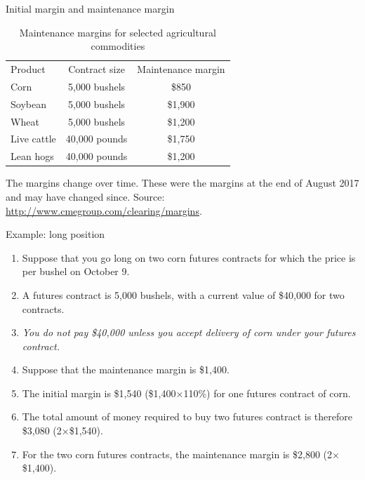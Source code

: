 \documentclass[table,xcolor=pdftex,dvipsnames]{beamer}\usepackage[]{graphicx}\usepackage[]{color}
\begin{document}
\begin{frame}{Initial margin and maintenance margin}
\begin{table}
\caption{Maintenance margins for selected agricultural commodities}
\scriptsize
\begin{tabular}{l c c}
  \toprule
  Product & Contract size& Maintenance margin  \\
  \addlinespace[0.075in]
  Corn & 5,000 bushels  & \$850 \\
  \addlinespace[0.075in]
  Soybean & 5,000 bushels & \$1,900 \\
  \addlinespace[0.075in]
  Wheat & 5,000 bushels  & \$1,200  \\
  \addlinespace[0.075in]
  Live cattle & 40,000 pounds & \$1,750  \\
  \addlinespace[0.075in]
  Lean hogs & 40,000 pounds & \$1,200  \\
  \bottomrule
\end{tabular}
\end{table}
\scriptsize
The margins change over time. These were the margins at the end of August 2017 and may have changed since. Source: \url{http://www.cmegroup.com/clearing/margins}.
\end{frame}



\begin{frame}{Example: long position}
\begin{enumerate}[label=\textbullet]
      \item Suppose that you go long on \textcolor[rgb]{1.00,0.00,0.00}{two} corn futures contracts for which the price is  per bushel on October 9.
      \item A futures contract is 5,000 bushels, with a current value of \$40,000 for two contracts.
      \item \emph{You do not pay \$40,000 unless you accept delivery of corn under your futures contract.}
      \item Suppose that the maintenance margin is \$1,400.
      \item The initial margin is \$1,540 (\$1,400$\times$110\%) for one futures contract of corn.
      \item The total amount of money required to buy two futures contract is therefore \$3,080 (2$\times$\$1,540).
      \item For the two corn futures contracts, the maintenance margin is \$2,800 (2$\times$\$1,400).
\end{enumerate}
\end{frame}
\end{document}

